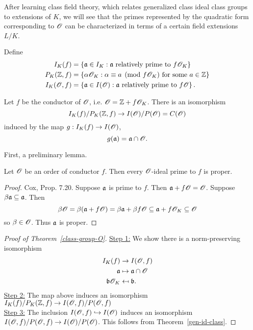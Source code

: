 After learning class field theory, which relates generalized class ideal class groups to extensions of $K$, we will see that the primes represented by the quadratic form corresponding to $\mathscr{O}$ can be characterized in terms of a certain field extensions $L/K$. 

\begin{df}
Define
\begin{align*}
I_K(f)&=%
\set{\ma\in I_K}{\ma\text{ relatively prime to }f\sO_K}\\
P_{K}(\Z,f)&=\set{\al\sO_K}{\al\equiv a\pmod{f\sO_K}\text{ for some }a\in \Z}\\
I_K(\sO,f)&=\set{\ma\in I(\sO)}{\ma\text{ relatively prime to }f\sO}.
\end{align*}
\end{df}
\begin{thm}
Let $f$ be the conductor of $\mathscr{O}$, i.e. $\mathscr{O}=\mathbb{Z}+f\mathscr{O}_K$. 
There is an isomorphism
\[
I_K(f)/P_K(\mathbb{Z},f)\to I(\mathscr{O})/P(\mathscr{O})=C(\mathscr{O})
\]
induced by the map $g:I_K(f)\to I(\mathscr{O})$,
\[
g(\mathfrak{a})=\mathfrak{a}\cap \mathscr{O}.
\]
\end{thm}
First, a preliminary lemma.
\begin{lem}
Let $\mathscr{O}$ be an order of conductor $f$. Then every $\mathscr{O}$-ideal prime to $f$ is proper.
\end{lem}
\begin{proof}
Cox, Prop. 7.20.
Suppose $\mathfrak{a}$ is prime to $f$. Then $\mathfrak{a}+f\mathscr{O}=\mathscr{O}$. Suppose $\beta\mathfrak{a}\subseteq \mathfrak{a}$. Then
\[
\beta \mathscr{O}=\beta(\mathfrak{a}+f\mathscr{O})=\beta \mathfrak{a} +\beta f\mathscr{O}\subseteq \mathfrak{a}+f\mathscr{O}_K\subseteq \mathscr{O}
\]
so $\beta \in \mathscr{O}$. Thus $\mathfrak{a}$ is proper.
\end{proof}
\begin{proof}[Proof of Theorem~\ref{class-group-O}]
\noindent\underline{Step 1:} We show there is a norm-preserving isomorphism 
\begin{align*}
I_K(f)&\to I(\mathscr{O},f)\\
\mathfrak{a}&\mapsto \mathfrak{a}\cap \mathscr{O}\\
\mathfrak{b}\mathscr{O}_K&\mapsfrom \mathfrak{b}.
\end{align*}
\noindent\underline{Step 2:} The map above induces an isomorphism $I_K(f)/P_K(\mathbb{Z},f)\to I(\mathscr{O},f)/P(\mathscr{O},f)$\\

\noindent\underline{Step 3:} The inclusion $I(\mathscr{O},f)\hookrightarrow I(\mathscr{O})$ induces an isomorphism $I(\mathscr{O},f)/P(\mathscr{O},f)\to I(\mathscr{O})/P(\mathscr{O})$. This follows from Theorem~\ref{gen-id-class}.
\end{proof}
